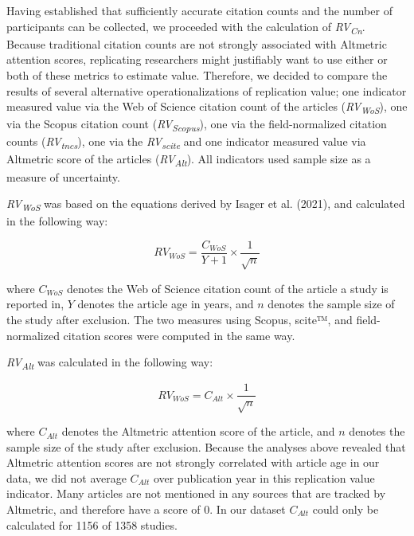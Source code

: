 \documentclass[
  man,floatsintext]{apa6}
\begin{document}
Having established that sufficiently accurate citation counts and the number of participants can be collected, we proceeded with the calculation of \emph{RV\textsubscript{Cn}}. Because traditional citation counts are not strongly associated with Altmetric attention scores, replicating researchers might justifiably want to use either or both of these metrics to estimate value. Therefore, we decided to compare the results of several alternative operationalizations of replication value; one indicator measured value via the Web of Science citation count of the articles (\emph{RV\textsubscript{WoS}}), one via the Scopus citation count (\emph{RV\textsubscript{Scopus}}), one via the field-normalized citation counts (\emph{RV\textsubscript{tncs}}), one via the \emph{RV\textsubscript{scite}} and one indicator measured value via Altmetric score of the articles (\emph{RV\textsubscript{Alt}}). All indicators used sample size as a measure of uncertainty.

\emph{RV\textsubscript{WoS}} was based on the equations derived by Isager et al. (2021), and calculated in the following way:

\begin{equation} 
  \tag{2}
  RV_{WoS} = \frac{C_{WoS}}{Y+1}\times\frac{1}{\sqrt{n}}
  \label{eq:2}
\end{equation}

where \(C_{WoS}\) denotes the Web of Science citation count of the article a study is reported in, \(Y\) denotes the article age in years, and \(n\) denotes the sample size of the study after exclusion. The two measures using Scopus, scite™, and field-normalized citation scores were computed in the same way.

\emph{RV\textsubscript{Alt}} was calculated in the following way:

\begin{equation} 
  \tag{3}
  RV_{WoS} = C_{Alt}\times\frac{1}{\sqrt{n}}
  \label{eq:3}
\end{equation}

where \(C_{Alt}\) denotes the Altmetric attention score of the article, and \(n\) denotes the sample size of the study after exclusion. Because the analyses above revealed that Altmetric attention scores are not strongly correlated with article age in our data, we did not average \(C_{Alt}\) over publication year in this replication value indicator. Many articles are not mentioned in any sources that are tracked by Altmetric, and therefore have a score of 0. In our dataset \(C_{Alt}\) could only be calculated for 1156 of 1358 studies.
\end{document}
